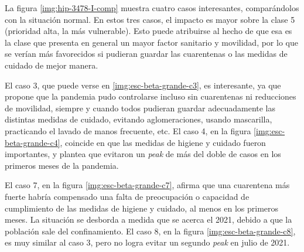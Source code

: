 

La figura \ref{img:hip-3478-I-comp} muestra cuatro casos interesantes, comparándolos con la situación normal. En estos tres casos, el impacto es mayor sobre la clase 5 (prioridad alta, la más vulnerable). Esto puede atribuirse al hecho de que esa es la clase que presenta en general un mayor factor sanitario y movilidad, por lo que se verían más favorecidos si pudieran guardar las cuarentenas o las medidas de cuidado de mejor manera.
 
 El caso 3, que puede verse en \ref{img:esc-beta-grande-c3}, es interesante, ya que propone que la pandemia pudo controlarse incluso sin cuarentenas ni reducciones de movilidad, siempre y cuando todos pudieran guardar adecuadamente las distintas medidas de cuidado, evitando aglomeraciones, usando mascarilla, practicando el lavado de manos frecuente, etc. El caso 4, en la figura \ref{img:esc-beta-grande-c4}, coincide en que las medidas de higiene y cuidado fueron importantes, y plantea que evitaron un \textit{peak} de más del doble de casos en los primeros meses de la pandemia. 
 
 
El caso 7, en la figura \ref{img:esc-beta-grande-c7}, afirma que una cuarentena más fuerte habría compensado una falta de preocupación o capacidad de cumplimiento de las medidas de higiene y cuidado, al menos en los primeros meses. La situación se desborda a medida que se acerca el 2021, debido a que la población sale del confinamiento. El caso 8, en la figura \ref{img:esc-beta-grande-c8}, es muy similar al caso 3, pero no logra evitar un segundo \textit{peak} en julio de 2021.

